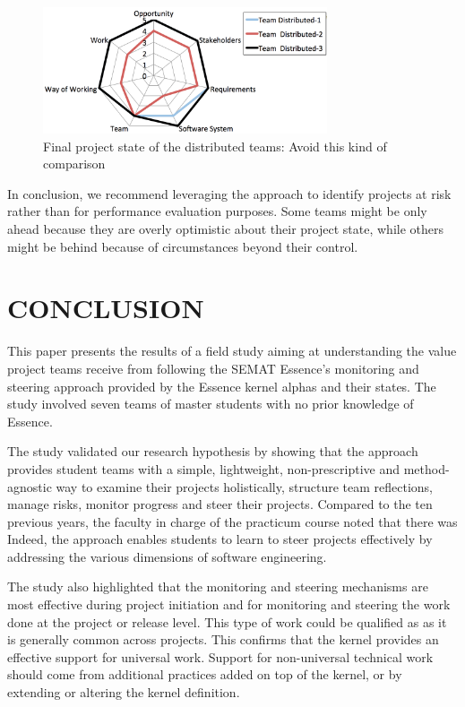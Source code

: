 \begin{figure}[t]
\centering
\includegraphics[width=3.30in]{project_steering_images/AvoidThisKindOfComparison.png}
\caption{Final project state of the distributed teams: Avoid this kind of comparison}
\label{AvoidThisKindOfComparison}
\end{figure}


In conclusion, we recommend leveraging the approach to identify projects at risk rather than for performance evaluation purposes. Some teams might be only ahead because they are overly optimistic about their project state, while others might be behind because of circumstances beyond their control.

\section{CONCLUSION}
This paper presents the results of a field study aiming at understanding the value project teams receive from following the SEMAT Essence's monitoring and steering approach provided by the Essence kernel alphas and their states. The study involved seven teams of master students with no prior knowledge of Essence.

The study validated our research hypothesis by showing that the approach provides student teams with a simple, lightweight, non-prescriptive and method-agnostic way to examine their projects holistically, structure team reflections, manage risks, monitor progress and steer their projects. Compared to the ten previous years, the faculty in charge of the practicum course noted that there was  Indeed, the approach enables students to learn to steer projects effectively by addressing the various dimensions of software engineering.

The study also highlighted that the monitoring and steering mechanisms are most effective during project initiation and for monitoring and steering the work done at the project or release level. This type of work could be qualified as  as it is generally common across projects. This confirms that the kernel provides an effective support for universal work. Support for non-universal technical work should come from additional practices added on top of the kernel, or by extending or altering the kernel definition.

